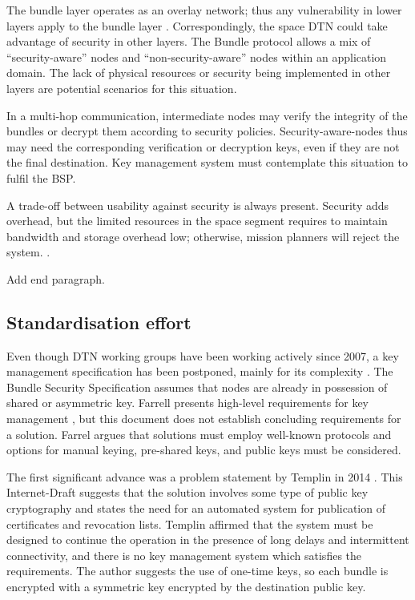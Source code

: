  
The bundle layer operates as an overlay network; thus any vulnerability in lower layers apply to the bundle layer \cite{rfc6257}. Correspondingly, the space DTN could take advantage of security in other layers. The Bundle protocol allows a mix of ``security-aware'' nodes and ``non-security-aware'' nodes within an application domain. The lack of physical resources or security being implemented in other layers are potential scenarios for this situation. 

In a multi-hop communication, intermediate nodes may verify the integrity of the bundles or decrypt them according to security policies. Security-aware-nodes thus may need the corresponding verification or decryption keys, even if they are not the final destination. Key management system must contemplate this situation to fulfil the BSP.

A trade-off between usability against security is always present. Security adds overhead, but the limited resources in the space segment requires to maintain bandwidth and storage overhead low; otherwise, mission planners will reject the system. \cite{book2012architecture}.

Add end paragraph.

\subsection{Standardisation effort}

Even though DTN working groups have been working actively since 2007, a key management specification has been postponed, mainly for its complexity \cite{rfc6257,irtf-dtnrg-sec-overview-06,templin-dtnskmps-00}. The Bundle Security Specification assumes that nodes are already in possession of shared or asymmetric key. Farrell presents high-level requirements for key management \cite{farrell-dtnrg-km-00}, but this document does not establish concluding requirements for a solution. Farrel argues that solutions must employ well-known protocols and options for manual keying, pre-shared keys, and public keys must be considered. 

The first significant advance was a problem statement by Templin in 2014  \cite{templin-dtnskmps-00}. This Internet-Draft suggests that the solution involves some type of public key cryptography and states the need for an automated system for publication of certificates and revocation lists. Templin affirmed that the system must be designed to continue the operation in the presence of long delays and intermittent connectivity, and there is no key management system which satisfies the requirements. The author suggests the use of one-time keys, so each bundle is encrypted with a symmetric key encrypted by the destination public key.  

